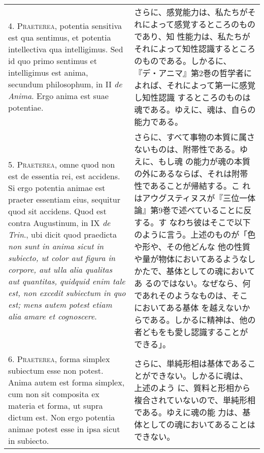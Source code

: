 \documentclass[paper=a4paper,fontsize=10pt,jafontsize=9pt,titlepage]{jlreq}
\begin{document}
\begin{longtable}{p{21em}p{21em}}
\\

4. {\scshape Praeterea}, potentia sensitiva est qua sentimus, et
potentia intellectiva qua intelligimus. Sed id quo primo sentimus et
intelligimus est anima, secundum philosophum, in II {\itshape de
Anima}. Ergo anima est suae potentiae.

&

さらに、感覚能力は、私たちがそれによって感覚するところのものであり、知
性能力は、私たちがそれによって知性認識するところのものである。しかるに、
『デ・アニマ』第2巻の哲学者によれば、それによって第一に感覚し知性認識
するところのものは魂である。ゆえに、魂は、自らの能力である。

\\


5. {\scshape Praeterea}, omne quod non est de essentia rei, est
accidens. Si ergo potentia animae est praeter essentiam eius, sequitur
quod sit accidens. Quod est contra Augustinum, in IX {\itshape de
Trin}., ubi dicit quod praedicta {\itshape non sunt in anima sicut in
subiecto, ut color aut figura in corpore, aut ulla alia qualitas aut
quantitas, quidquid enim tale est, non excedit subiectum in quo est;
mens autem potest etiam alia amare et cognoscere}.

&

さらに、すべて事物の本質に属さないものは、附帯性である。ゆえに、もし魂
の能力が魂の本質の外にあるならば、それは附帯性であることが帰結する。こ
れはアウグスティヌスが『三位一体論』第9巻で述べていることに反する。す
なわち彼はそこで以下のように言う。上述のものが「色や形や、その他どんな
他の性質や量が物体においてあるようなしかたで、基体としての魂においてあ
るのではない。なぜなら、何であれそのようなものは、そこにおいてある基体
を越えないからである。しかるに精神は、他の者どもをも愛し認識することが
できる」。

\\



6. {\scshape Praeterea}, forma simplex subiectum esse non
potest. Anima autem est forma simplex, cum non sit composita ex
materia et forma, ut supra dictum est. Non ergo potentia animae potest
esse in ipsa sicut in subiecto.

&

 さらに、単純形相は基体であることができない。しかるに魂は、上述のよう
 に、質料と形相から複合されていないので、単純形相である。ゆえに魂の能
 力は、基体としての魂においてあることはできない。


\\




\end{longtable}
\end{document}
